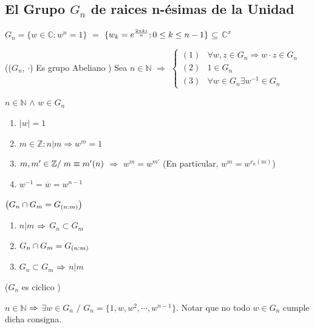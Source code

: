 \documentclass[10pt]{article}
\begin{document}
\begin{center}
\subsection{El Grupo $G_n$ de raices n-ésimas de la Unidad} 
\end{center}

\begin{defi} 
$G_n = \lbrace w \in \mathbb{C} : w^n = 1 \rbrace$ $=$ $\lbrace w_k = e^{\frac{2 \pi k i }{n}} ; 0 \leq k \leq n-1 \rbrace$ $\subseteq$ $\mathbb{C}^x$ 
\end{defi}


\begin{prop}
 (($G_n$, $\cdot$) Es grupo Abeliano )
Sea $n \in \mathbb{N}$ $\Rightarrow$ $\left\lbrace \begin{array}{ll}
(1) &  \forall w,z \in G_n \Rightarrow w \cdot z \in G_n\\
(2) & 1 \in G_n\\
(3) & \forall w \in G_n \exists w^{-1} \in G_n
\end{array}\right.$
\end{prop}

\begin{prop}
$n \in \mathbb{N}$ $\land$ $w \in G_n$
\begin{enumerate}
\item $|w| =1$
\item $m \in \mathbb{Z}: n | m \Rightarrow w^m = 1$
\item $m, m' \in \mathbb{Z} / \hspace{0.1cm} m \equiv m' (n) $ $\Rightarrow$ $w^m = w^{m'}$ (En particular, $w^m = w^{r_n(m)}$)
\item $w^{-1} = \overline{w} = w^{n-1}$
\end{enumerate} 
\end{prop}

\begin{prop}
 $\left( G_n \cap G_m = G_{(n:m)} \right)$
\begin{enumerate}
\item $n | m$ $\Rightarrow$ $G_n \subset G_m$
\item $G_n \cap G_m = G_{(n:m)}$ 
\item $G_n \subset G_m$ $\Rightarrow$ $n | m$
\end{enumerate}
\end{prop}

\begin{prop} ($G_n$ es ciclico )

$n \in \mathbb{N}$ $\Rightarrow$ $\exists w \in G_n$ $/$ $G_n = \lbrace 1,w,w^2, \cdots, w^{n-1}\rbrace$. Notar que no todo $w \in G_n$ cumple dicha consigna. 
\end{prop}
\end{document}
